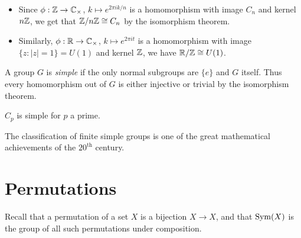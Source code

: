 \documentclass{../template/note}
\begin{document}
    \begin{example}
        \begin{itemize}
            \item Since \(\phi: \mathbb Z \to \mathbb C_\times\), \(k \mapsto e^{2\pi i k/n}\) is a homomorphism with image \(C_n\) and kernel \(n \mathbb Z\), we get that \(\mathbb Z/n\mathbb Z \cong C_n\) by the isomorphism theorem.
            \item Similarly, \(\phi: \mathbb R \to \mathbb C_\times\), \(k \mapsto e^{2\pi i t}\) is a homomorphism with image \(\{z: |z| = 1\} = U(1)\) and kernel \(\mathbb Z\), we have \(\mathbb R/\mathbb Z \cong U(1)\).
        \end{itemize}
    \end{example}

    
    \begin{definition}
        A group \(G\) is \emph{simple} if the only normal subgroups are \(\{e\}\) and \(G\) itself. Thus every homomorphism out of \(G\) is either injective or trivial by the isomorphism theorem.
    \end{definition}
    
    \begin{example}
        \(C_p\) is simple for \(p\) a prime.
    \end{example}
    
    \begin{remark*}
        The classification of finite simple groups is one of the great mathematical achievements of the \(20^\text{th}\) century.
    \end{remark*}
    
    \section{Permutations}

    Recall that a permutation of a set \(X\) is a bijection \(X \to X\), and that \(\operatorname{Sym}(X)\) is the group of all such permutations under composition.
\end{document}
